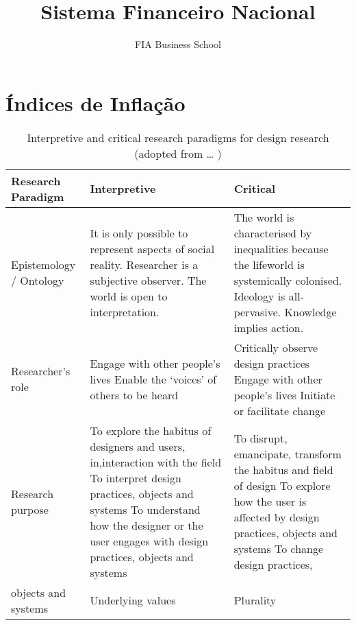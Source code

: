 \documentclass{article}\usepackage[]{graphicx}\usepackage[]{xcolor}
\title{Sistema Financeiro Nacional}
\author{FIA Business School}
\begin{document}
\maketitle

\section*{Índices de Inflação}

\begin{table}[h]
    \caption{Interpretive and critical research paradigms for design research (adopted from \ldots%
    )}
    \label{crouch}
    \begin{tabular}{  l  p{3.4cm}  p{3.4cm} }
        \toprule
\textbf{Research Paradigm}      
& \textbf{Interpretive}   
& \textbf{Critical} \\\midrule
Epistemology / Ontology 
& It is only possible to represent aspects of social reality. Researcher is a subjective observer. The world is open to interpretation.
& The world is characterised by inequalities because the lifeworld is systemically colonised. Ideology is all-pervasive. Knowledge implies action. \\\hline
Researcher’s role       
& Engage with other people’s lives Enable the ‘voices’ of others to be heard                         
& Critically observe design practices Engage with other people’s lives Initiate or facilitate change  \\\hline
Research purpose        
& To explore the habitus of designers and users, in,interaction with the field To interpret design practices, objects and systems To understand how the designer or the user engages with design practices, objects and systems 
& To disrupt, emancipate, transform the habitus and field of design To explore how the user is affected by design practices, objects and systems To change design practices, \\\hline
objects and systems &
Underlying values       
& Plurality \\
        \bottomrule
    \end{tabular}
\end{table}
\end{document}
